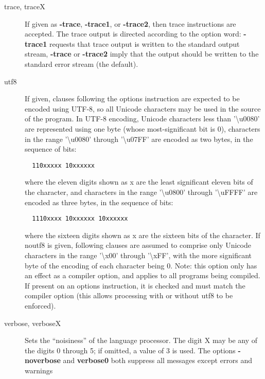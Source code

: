 \begin{description}
\item[trace, traceX]
If given as \textbf{-trace}, \textbf{-trace1}, or \textbf{-trace2}, then trace instructions are accepted. The trace output is directed according to the option word: \textbf{-trace1} requests that trace output is written to the standard output stream, \textbf{-trace} or \textbf{-trace2} imply that the output should be written to the standard error stream (the default).
\item[utf8]
If given, clauses following the options instruction are expected to be encoded using UTF-8, so all Unicode characters may be used in the source of the program.
In UTF-8 encoding, Unicode characters less than '\textbackslash u0080' are represented using one byte (whose most-significant bit is 0), characters in the range '\textbackslash u0080' through '\textbackslash u07FF' are encoded as two bytes, in the sequence of bits:
\begin{verbatim}
  110xxxxx 10xxxxxx
\end{verbatim}
where the eleven digits shown as x are the least significant eleven bits of the character, and characters in the range '\textbackslash u0800' through '\textbackslash uFFFF' are encoded as three bytes, in the sequence of bits:
\begin{verbatim}
  1110xxxx 10xxxxxx 10xxxxxx
\end{verbatim}
where the sixteen digits shown as x are the sixteen bits of the character.
If noutf8 is given, following clauses are assumed to comprise only Unicode characters in the range '\textbackslash x00' through '\textbackslash xFF', with the more significant byte of the encoding of each character being 0.
Note: this option only has an effect as a compiler option, and applies to all programs being compiled. If present on an options instruction, it is checked and must match the compiler option (this allows processing with or without utf8 to be enforced).
\item[verbose, verboseX]
Sets the “noisiness” of the language processor. The digit X may be any of the digits 0 through 5; if omitted, a value of 3 is used. The options \textbf{-noverbose} and \textbf{verbose0} both suppress all messages except errors and warnings
\end{description}

